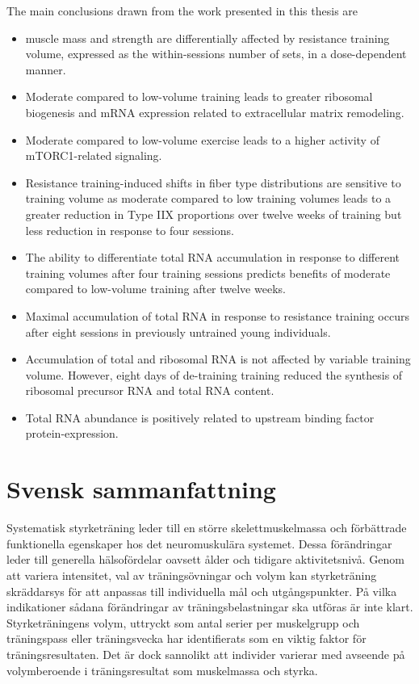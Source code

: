 \documentclass[twoside,10pt]{gihclass} %
\begin{document}
The main conclusions drawn from the work presented in this thesis are
\begin{itemize}
  \item muscle mass and strength are differentially affected by resistance training volume, expressed as the within-sessions number of sets, in a dose-dependent manner.
  \item Moderate compared to low-volume training leads to greater ribosomal biogenesis and mRNA expression related to extracellular matrix remodeling.
  \item Moderate compared to low-volume exercise leads to a higher activity of
mTORC1-related signaling.
  \item Resistance training-induced shifts in fiber type distributions are sensitive to training volume as moderate compared to low training volumes leads to a greater reduction in Type IIX proportions over twelve weeks of training but less reduction in response to four sessions.
  \item The ability to differentiate total RNA accumulation in response to different training volumes after four training sessions predicts benefits of moderate compared to low-volume training after twelve weeks.
  \item Maximal accumulation of total RNA in response to resistance training occurs after eight sessions in previously untrained young individuals.
  \item Accumulation of total and ribosomal RNA is not affected by variable training volume. However, eight days of de-training training reduced the synthesis of ribosomal precursor RNA and total RNA content.
  \item Total RNA abundance is positively related to upstream binding factor protein-expression.
\end{itemize}
\hypertarget{svensk-sammanfattning}{%
\chapter{Svensk sammanfattning}\label{svensk-sammanfattning}}

Systematisk styrketräning leder till en större skelettmuskelmassa och förbättrade funktionella egenskaper hos det neuromuskulära systemet. Dessa förändringar leder till generella hälsofördelar oavsett ålder och tidigare aktivitetsnivå. Genom att variera intensitet, val av träningsövningar och volym kan styrketräning skräddarsys för att anpassas till individuella mål och utgångspunkter. På vilka indikationer sådana förändringar av träningsbelastningar ska utföras är inte klart. Styrketräningens volym, uttryckt som antal serier per muskelgrupp och träningspass eller träningsvecka har identifierats som en viktig faktor för träningsresultaten. Det är dock sannolikt att individer varierar med avseende på volymberoende i träningsresultat som muskelmassa och styrka.
\end{document}
